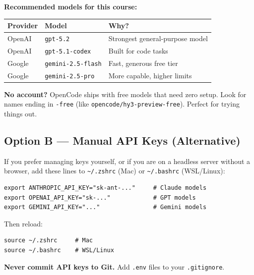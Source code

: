 \documentclass[12pt]{article}
\begin{document}
\begin{ex-box}
\textbf{Recommended models for this course:}

\medskip
\begin{tabular}{lll}
\toprule
\textbf{Provider} & \textbf{Model} & \textbf{Why?} \\
\midrule
OpenAI & \texttt{gpt-5.2}         & Strongest general-purpose model \\
OpenAI & \texttt{gpt-5.1-codex}   & Built for code tasks \\
Google & \texttt{gemini-2.5-flash} & Fast, generous free tier \\
Google & \texttt{gemini-2.5-pro}   & More capable, higher limits \\
\bottomrule
\end{tabular}

\medskip
\textbf{No account?} OpenCode ships with free models that need zero setup.  Look for names ending in \texttt{-free} (like \texttt{opencode/hy3-preview-free}).  Perfect for trying things out.
\end{ex-box}

\subsection{Option B --- Manual API Keys (Alternative)}

If you prefer managing keys yourself, or if you are on a headless server without a browser, add these lines to \texttt{\textasciitilde/.zshrc} (Mac) or \texttt{\textasciitilde/.bashrc} (WSL/Linux):

\begin{lstlisting}[style=term]
export ANTHROPIC_API_KEY="sk-ant-..."     # Claude models
export OPENAI_API_KEY="sk-..."            # GPT models
export GEMINI_API_KEY="..."               # Gemini models
\end{lstlisting}

Then reload:

\begin{lstlisting}[style=term]
source ~/.zshrc     # Mac
source ~/.bashrc    # WSL/Linux
\end{lstlisting}

\begin{alert-box}
\textbf{Never commit API keys to Git.} Add \texttt{.env} files to your \texttt{.gitignore}.
\end{alert-box}

\end{document}

